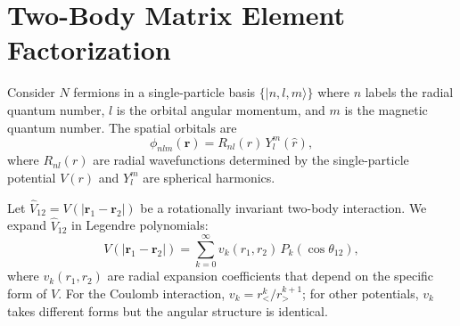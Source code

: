 \documentclass[twocolumn,pra,amsmath,amssymb,superscriptaddress]{revtex4-2}
\begin{document}
\section{Two-Body Matrix Element Factorization}
\label{sec:factorization}

Consider $N$ fermions in a single-particle basis
$\{|n, l, m\rangle\}$ where $n$ labels the radial quantum number,
$l$ is the orbital angular momentum, and $m$ is the magnetic quantum
number.  The spatial orbitals are
\begin{equation}
  \phi_{nlm}(\mathbf{r}) = R_{nl}(r)\, Y_l^m(\hat{r}),
\end{equation}
where $R_{nl}(r)$ are radial wavefunctions determined by the
single-particle potential $V(r)$ and $Y_l^m$ are spherical
harmonics.

Let $\hat{V}_{12} = V(|\mathbf{r}_1 - \mathbf{r}_2|)$ be a
rotationally invariant two-body interaction.  We expand $\hat{V}_{12}$
in Legendre polynomials:
\begin{equation}
  V(|\mathbf{r}_1 - \mathbf{r}_2|)
  = \sum_{k=0}^{\infty} v_k(r_1, r_2)\, P_k(\cos\theta_{12}),
  \label{eq:legendre}
\end{equation}
where $v_k(r_1, r_2)$ are radial expansion coefficients that depend
on the specific form of $V$.  For the Coulomb interaction,
$v_k = r_<^k / r_>^{k+1}$; for other potentials, $v_k$ takes
different forms but the angular structure is identical.
\end{document}

